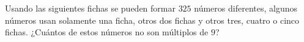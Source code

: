 Usando las siguientes fichas se pueden formar $325$ números diferentes, algunos números usan solamente una ficha, otros dos fichas y otros tres, cuatro o cinco fichas. ¿Cuántos de estos números no son múltiplos de $9$?